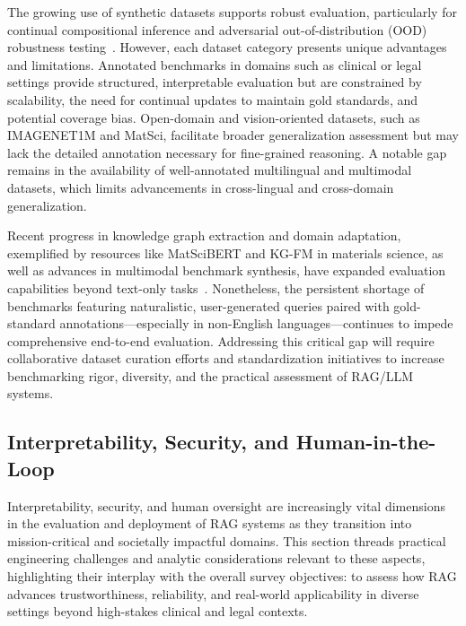 \documentclass[sigconf]{acmart}
\begin{document}
The growing use of synthetic datasets supports robust evaluation, particularly for continual compositional inference and adversarial out-of-distribution (OOD) robustness testing~\cite{ref54,ref55,ref61,ref62}. However, each dataset category presents unique advantages and limitations. Annotated benchmarks in domains such as clinical or legal settings provide structured, interpretable evaluation but are constrained by scalability, the need for continual updates to maintain gold standards, and potential coverage bias. Open-domain and vision-oriented datasets, such as IMAGENET1M and MatSci, facilitate broader generalization assessment but may lack the detailed annotation necessary for fine-grained reasoning. A notable gap remains in the availability of well-annotated multilingual and multimodal datasets, which limits advancements in cross-lingual and cross-domain generalization.

Recent progress in knowledge graph extraction and domain adaptation, exemplified by resources like MatSciBERT and KG-FM in materials science, as well as advances in multimodal benchmark synthesis, have expanded evaluation capabilities beyond text-only tasks~\cite{ref7,ref11,ref19,ref20,ref33,ref35,ref36,ref37,ref47,ref61}. Nonetheless, the persistent shortage of benchmarks featuring naturalistic, user-generated queries paired with gold-standard annotations---especially in non-English languages---continues to impede comprehensive end-to-end evaluation. Addressing this critical gap will require collaborative dataset curation efforts and standardization initiatives to increase benchmarking rigor, diversity, and the practical assessment of RAG/LLM systems.

\subsection{Interpretability, Security, and Human-in-the-Loop}

Interpretability, security, and human oversight are increasingly vital dimensions in the evaluation and deployment of RAG systems as they transition into mission-critical and societally impactful domains. This section threads practical engineering challenges and analytic considerations relevant to these aspects, highlighting their interplay with the overall survey objectives: to assess how RAG advances trustworthiness, reliability, and real-world applicability in diverse settings beyond high-stakes clinical and legal contexts.
\end{document}
